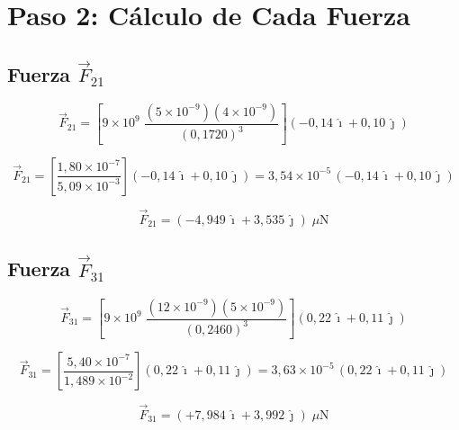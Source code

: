 \documentclass[12pt,letterpaper]{article}
\begin{document}
\section*{Paso 2: C\'alculo de Cada Fuerza}

\subsection*{Fuerza $\vec{F}_{21}$}

\begin{equation*}
\vec{F}_{21} = \left[9\times10^9\;\frac{(5\times10^{-9})(4\times10^{-9})}{(0{,}1720)^3}\right]
\left(-0{,}14\,\hat{\imath} + 0{,}10\,\hat{\jmath}\right)
\end{equation*}

\begin{equation*}
\vec{F}_{21} = \left[\frac{1{,}80\times10^{-7}}{5{,}09\times10^{-3}}\right]
\left(-0{,}14\,\hat{\imath} + 0{,}10\,\hat{\jmath}\right)
= 3{,}54\times10^{-5}\,
\left(-0{,}14\,\hat{\imath} + 0{,}10\,\hat{\jmath}\right)
\end{equation*}

\begin{equation*}
\boxed{\vec{F}_{21} = \left(-4{,}949\,\hat{\imath} + 3{,}535\,\hat{\jmath}\right)\;\mu\text{N}}
\end{equation*}

\subsection*{Fuerza $\vec{F}_{31}$}

\begin{equation*}
\vec{F}_{31} = \left[9\times10^9\;\frac{(12\times10^{-9})(5\times10^{-9})}{(0{,}2460)^3}\right]
\left(0{,}22\,\hat{\imath} + 0{,}11\,\hat{\jmath}\right)
\end{equation*}

\begin{equation*}
\vec{F}_{31} = \left[\frac{5{,}40\times10^{-7}}{1{,}489\times10^{-2}}\right]
\left(0{,}22\,\hat{\imath} + 0{,}11\,\hat{\jmath}\right)
= 3{,}63\times10^{-5}\,
\left(0{,}22\,\hat{\imath} + 0{,}11\,\hat{\jmath}\right)
\end{equation*}

\begin{equation*}
\boxed{\vec{F}_{31} = \left(+7{,}984\,\hat{\imath} + 3{,}992\,\hat{\jmath}\right)\;\mu\text{N}}
\end{equation*}
\end{document}
